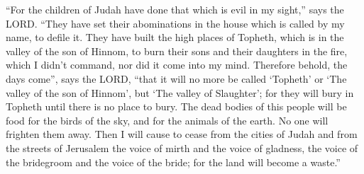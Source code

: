 \myverse{}“For the children of Judah have done that which is evil in my sight,” says the LORD. “They have set their abominations in the house which is called by my name, to defile it. \myverse{}They have built the high places of Topheth, which is in the valley of the son of Hinnom, to burn their sons and their daughters in the fire, which I didn’t command, nor did it come into my mind. \myverse{}Therefore behold, the days come”, says the LORD, “that it will no more be called ‘Topheth’ or ‘The valley of the son of Hinnom’, but ‘The valley of Slaughter’; for they will bury in Topheth until there is no place to bury. \myverse{}The dead bodies of this people will be food for the birds of the sky, and for the animals of the earth. No one will frighten them away. \myverse{}Then I will cause to cease from the cities of Judah and from the streets of Jerusalem the voice of mirth and the voice of gladness, the voice of the bridegroom and the voice of the bride; for the land will become a waste.”


